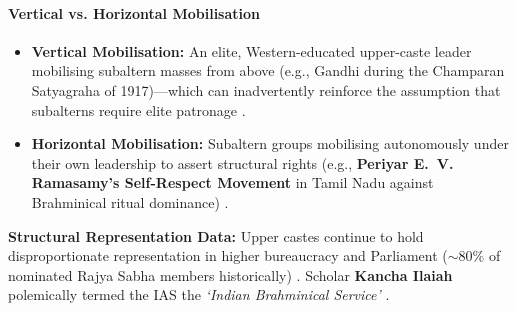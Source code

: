 \paragraph{Vertical vs. Horizontal Mobilisation}
\begin{ComparisonBox}
\begin{itemize}
    \item \textbf{Vertical Mobilisation:} An elite, Western-educated upper-caste leader mobilising subaltern masses from above (e.g., Gandhi during the Champaran Satyagraha of 1917)---which can inadvertently reinforce the assumption that subalterns require elite patronage .
    \item \textbf{Horizontal Mobilisation:} Subaltern groups mobilising autonomously under their own leadership to assert structural rights (e.g., \textbf{Periyar E.~V. Ramasamy's Self-Respect Movement} in Tamil Nadu against Brahminical ritual dominance) .
\end{itemize}
\textbf{Structural Representation Data:} Upper castes continue to hold disproportionate representation in higher bureaucracy and Parliament ($\sim 80\%$ of nominated Rajya Sabha members historically) . Scholar \textbf{Kancha Ilaiah} polemically termed the IAS the \textit{`Indian Brahminical Service'} .
\end{ComparisonBox}

